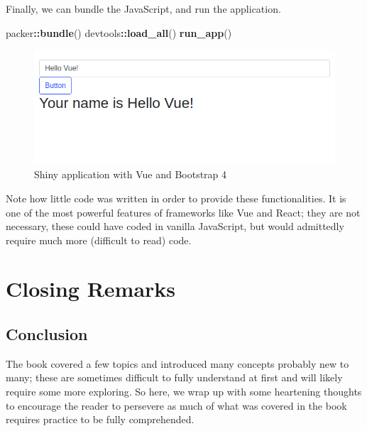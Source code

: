 \documentclass[
]{krantz}
\makeatletter
\newenvironment{Shaded}{\begin{snugshade}}{\end{snugshade}}
\newcommand{\KeywordTok}[1]{\textcolor[rgb]{0.27,0.27,0.27}{\textbf{#1}}}
\newcommand{\NormalTok}[1]{#1}
\newcommand{\OperatorTok}[1]{\textcolor[rgb]{0.43,0.43,0.43}{\textbf{#1}}}
\newenvironment{kframe}{%
\medskip{}
\setlength{\fboxsep}{.8em}
 \def\at@end@of@kframe{}%
 \ifinner\ifhmode%
  \def\at@end@of@kframe{\end{minipage}}%
  \begin{minipage}{\columnwidth}%
 \fi\fi%
 \def\FrameCommand##1{\hskip\@totalleftmargin \hskip-\fboxsep
 \colorbox{shadecolor}{##1}\hskip-\fboxsep
     \hskip-\linewidth \hskip-\@totalleftmargin \hskip\columnwidth}%
 \MakeFramed {\advance\hsize-\width
   \@totalleftmargin\z@ \linewidth\hsize
   \@setminipage}}%
 {\par\unskip\endMakeFramed%
 \at@end@of@kframe}
\renewenvironment{Shaded}{\begin{kframe}}{\end{kframe}}
\makeatother
\begin{document}
Finally, we can bundle the JavaScript, and run the application.

\begin{Shaded}
\begin{Highlighting}[]
\NormalTok{packer}\OperatorTok{::}\KeywordTok{bundle}\NormalTok{()}
\NormalTok{devtools}\OperatorTok{::}\KeywordTok{load\_all}\NormalTok{()}
\KeywordTok{run\_app}\NormalTok{()}
\end{Highlighting}
\end{Shaded}

\begin{figure}[t]

{\centering \includegraphics[width=1\linewidth]{images/vue-bs4} 

}

\caption{Shiny application with Vue and Bootstrap 4}\label{fig:vue-bs4}
\end{figure}

Note how little code was written in order to provide these functionalities. It is one of the most powerful features of frameworks like Vue and React; they are not necessary, these could have coded in vanilla JavaScript, but would admittedly require much more (difficult to read) code.

\hypertarget{part-closing-remarks}{%
\part{Closing Remarks}\label{part-closing-remarks}}

\hypertarget{conclusion}{%
\chapter{Conclusion}\label{conclusion}}

The book covered a few topics and introduced many concepts probably new to many; these are sometimes difficult to fully understand at first and will likely require some more exploring. So here, we wrap up with some heartening thoughts to encourage the reader to persevere as much of what was covered in the book requires practice to be fully comprehended.
\end{document}

